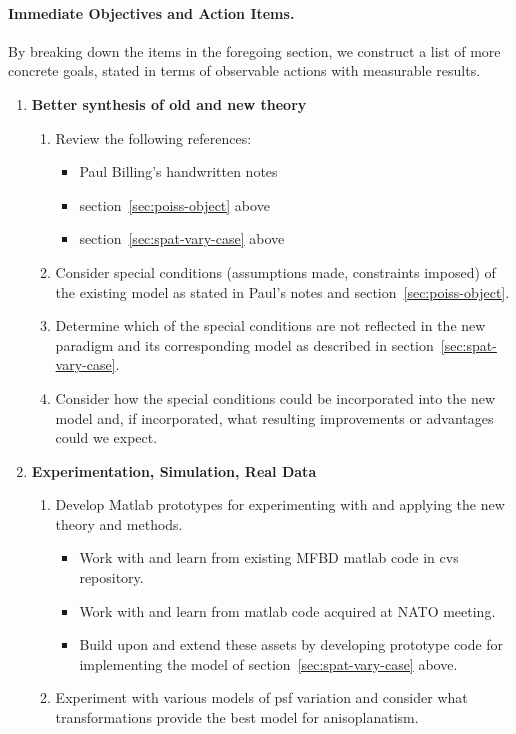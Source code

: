 \paragraph{Immediate Objectives and Action Items.} By breaking down the items
in the foregoing section, we construct a list of more concrete goals, stated
in terms of observable actions with measurable results. 
\begin{enumerate}
\item {\bf Better synthesis of old and new theory}
\begin{enumerate}
\item Review the following references:
\begin{itemize}
\item Paul Billing's handwritten notes\label{item:revref1}
\item section~\ref{sec:poiss-object} above
\item section~\ref{sec:spat-vary-case} above
\end{itemize}
\item Consider special conditions (\eg assumptions made, constraints imposed)
  of the existing model as stated in Paul's notes and section~\ref{sec:poiss-object}.
\item Determine which of the special conditions are not reflected in the new paradigm
 and its corresponding model as described in section~\ref{sec:spat-vary-case}.
\item Consider how the special conditions could be incorporated into the new
  model and, if incorporated, what resulting improvements or advantages could
  we expect.
\end{enumerate}
\item {\bf Experimentation, Simulation, Real Data}
\begin{enumerate}
\item Develop Matlab prototypes for experimenting with and applying the new theory and methods. 
\begin{itemize}
\item Work with and learn from existing MFBD matlab code in cvs repository.
\item Work with and learn from matlab code acquired at NATO meeting.
\item Build upon and extend these assets by developing prototype code for
  implementing the model of section~\ref{sec:spat-vary-case} above. 
\end{itemize}
\item Experiment with various models of psf variation and consider what
  transformations provide the best model for anisoplanatism. 
\end{enumerate}
\end{enumerate}

